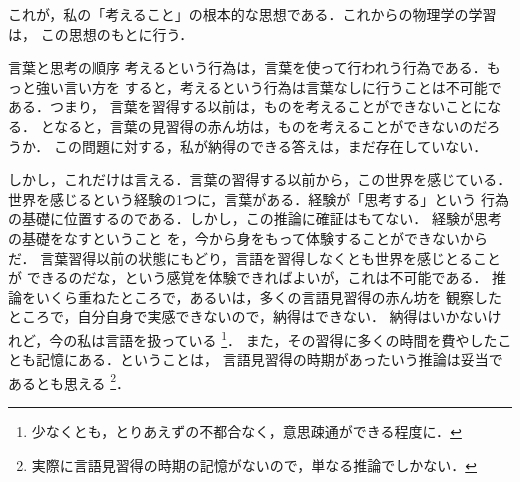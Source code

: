             これが，私の「考えること」の根本的な思想である．これからの物理学の学習は，
            この思想のもとに行う．

            \begin{memo}{言葉と思考の順序}
                考えるという行為は，言葉を使って行われう行為である．もっと強い言い方を
                すると，考えるという行為は言葉なしに行うことは不可能である．つまり，
                言葉を習得する以前は，ものを考えることができないことになる．
                となると，言葉の見習得の赤ん坊は，ものを考えることができないのだろうか．
                この問題に対する，私が納得のできる答えは，まだ存在していない．

                しかし，これだけは言える．言葉の習得する以前から，この世界を感じている．
                世界を感じるという経験の1つに，言葉がある．経験が「思考する」という
                行為の基礎に位置するのである．しかし，この推論に確証はもてない．
                経験が思考の基礎をなすということ
                を，今から身をもって体験することができないからだ．
                言葉習得以前の状態にもどり，言語を習得しなくとも世界を感じとることが
                できるのだな，という感覚を体験できればよいが，これは不可能である．
                推論をいくら重ねたところで，あるいは，多くの言語見習得の赤ん坊を
                観察したところで，自分自身で実感できないので，納得はできない．
                納得はいかないけれど，今の私は言語を扱っている
                    \footnote{
                        少なくとも，とりあえずの不都合なく，意思疎通ができる程度に．
                   }．
                また，その習得に多くの時間を費やしたことも記憶にある．ということは，
                言語見習得の時期があったいう推論は妥当であるとも思える
                    \footnote{
                        実際に言語見習得の時期の記憶がないので，単なる推論でしかない．
                    }．
            \end{memo}

